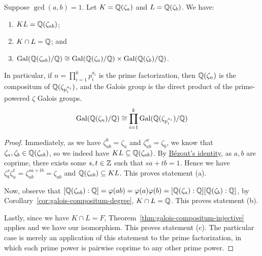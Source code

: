 \begin{proposition}\label{prop:coprime-compositum}
    Suppose \(\gcd(a,b) = 1\).
    Let \(K = \mathbb{Q}(\zeta_a)\) and \(L = \mathbb{Q}(\zeta_b)\).
    We have:
    \begin{enumerate}[label={(\alph*)}, itemsep=0mm]
        \item \(KL = \mathbb{Q}(\zeta_{ab})\);
        \item \(K \cap L = \mathbb{Q}\); and
        \item \(\operatorname{Gal}(\mathbb{Q}(\zeta_{ab})/\mathbb{Q}) \cong \operatorname{Gal}(\mathbb{Q}(\zeta_a)/\mathbb{Q}) \times \operatorname{Gal}(\mathbb{Q}(\zeta_b)/\mathbb{Q})\).
    \end{enumerate}
    In particular, if \(n = \prod_{i=1}^k p_i^{a_i}\) is the prime factorization,
    then \(\mathbb{Q}(\zeta_n)\) is the compositum of \(\mathbb{Q}(\zeta_{p_i^{a_i}})\),
    and the Galois group is the direct product of the prime-powered \(\zeta\) Galois groups.
    \begin{equation*}
        \operatorname{Gal}(\mathbb{Q}(\zeta_n)/\mathbb{Q}) \cong \prod_{i=1}^k \operatorname{Gal}(\mathbb{Q}(\zeta_{p_i^{a_i}})/\mathbb{Q})
    \end{equation*}
\end{proposition}
\begin{proof}
    Immediately, as we have \(\zeta_{ab}^b = \zeta_a\) and \(\zeta_{ab}^a = \zeta_b\),
    we know that \(\zeta_a,\zeta_b \in \mathbb{Q}(\zeta_{ab})\),
    so we indeed have \(KL \subseteq \mathbb{Q}(\zeta_{ab})\).
    By \hyperref[thm:bezout]{B\'ezout's identity}, as \(a,b\) are coprime,
    there exists some \(s,t \in \mathbb{Z}\) such that \(sa+tb = 1\).
    Hence we have \(\zeta_b^s\zeta_a^t = \zeta_{ab}^{sa+tb} = \zeta_{ab}\)
    and \(\mathbb{Q}(\zeta_{ab}) \subseteq KL\).
    This proves statement (a).

    Now, observe that \([\mathbb{Q}(\zeta_{ab}):\mathbb{Q}] = \varphi(ab) = \varphi(a)\varphi(b) = [\mathbb{Q}(\zeta_a):\mathbb{Q}][\mathbb{Q}(\zeta_b):\mathbb{Q}]\),
    by Corollary~\ref{cor:galois-compositum-degree}, \(K \cap L = \mathbb{Q}\).
    This proves statement (b).

    Lastly, since we have \(K \cap L = F\),
    Theorem~\ref{thm:galois-compositum-injective} applies and we have our isomorphism.
    This proves statement (c).
    The particular case is merely an application of this statement to the prime factorization,
    in which each prime power is pairwise coprime to any other prime power.
\end{proof}

